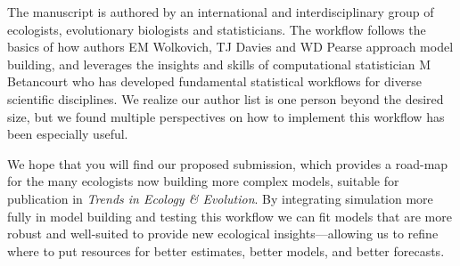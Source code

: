\documentclass[11pt]{article}
\begin{document}

The manuscript is authored by an international and interdisciplinary group of ecologists, evolutionary biologists and statisticians. The workflow follows the basics of how authors EM Wolkovich, TJ Davies and WD Pearse approach model building, and leverages the insights and skills of computational statistician M Betancourt who has developed fundamental statistical workflows for diverse scientific disciplines. We realize our author list is one person beyond the desired size, but we found multiple perspectives on how to implement this workflow has been especially useful. %

We hope that you will find our proposed submission, which provides a road-map for the many ecologists now building more complex models, suitable for publication in \emph{Trends in Ecology \& Evolution}. By integrating simulation more fully in model building and testing this workflow we can fit models that are more robust and well-suited to provide new ecological insights---allowing us to refine where to put resources for better estimates, better models, and better forecasts. %
\end{document}
